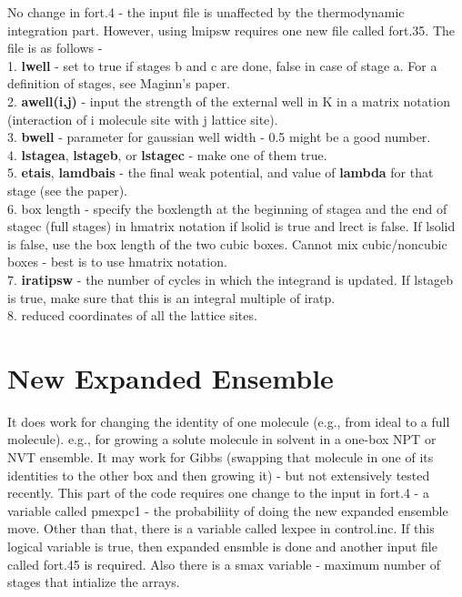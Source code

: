 \documentclass[12pt,letterpaper]{article}
\begin{document}
{{{{{{{\noindent  No change in fort.4 - the input file is unaffected by the thermodynamic
integration part. However, using lmipsw requires one new file called
fort.35. The file is as follows -\\
1. {\bf lwell} - set to true if stages b and c are done, false in case of stage a.
For a definition of stages, see Maginn's paper.\\
2. {\bf awell(i,j)} - input the strength of the external well in K in a
 matrix notation (interaction of i molecule site with j lattice site). \\
3. {\bf bwell} - parameter for gaussian well width - 0.5 might be a good
 number. \\
4. {\bf lstagea}, {\bf lstageb}, or {\bf lstagec} - make one of them true.\\
5. {\bf etais}, {\bf lamdbais} - the final weak potential, and value of {\bf lambda} for
 that stage (see the paper).\\ 
6. box length - specify the boxlength at the beginning of stagea and
 the end of stagec (full stages) in hmatrix notation if lsolid is true
 and lrect is false. If lsolid is false, use the box length of the two
 cubic boxes. Cannot mix cubic/noncubic boxes - best is to use 
 hmatrix notation. \\
7. {\bf iratipsw} - the number of cycles in which the integrand is updated.
 If lstageb is true, make sure that this is an integral multiple
 of iratp.\\
8. reduced coordinates of all the lattice sites.

\section{New Expanded Ensemble}
\noindent It does work for changing the identity of one molecule (e.g., from ideal
to a full molecule). e.g., for growing a solute molecule in solvent
in a one-box NPT or NVT ensemble. It may work for Gibbs (swapping
that molecule in one of its identities to the other box and then
growing it) - but not extensively tested recently. This part of the
code requires one change to the input in fort.4 - a variable
called pmexpc1 - the probabiliity of doing the new expanded ensemble
move. Other than that, there is a variable called lexpee in control.inc.
If this logical variable is true, then expanded ensmble is done and another
input file called fort.45 is required. Also there is a smax variable -
maximum number of stages that intialize the arrays.

}}}}}}}
\end{document}
